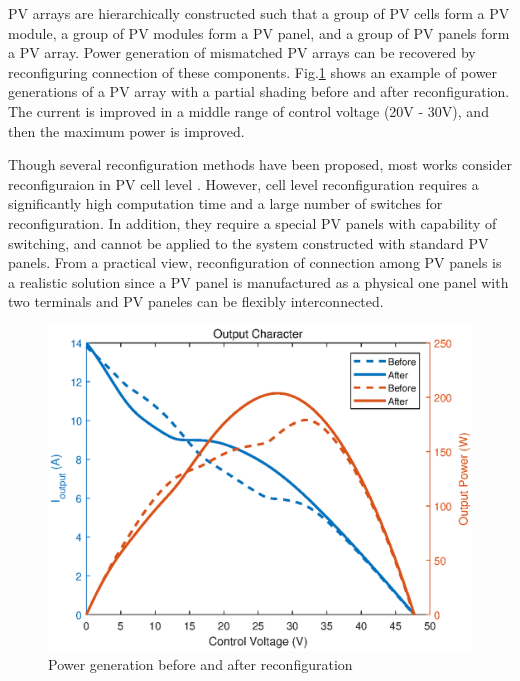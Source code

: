 \documentclass[conference]{IEEEtran}
\begin{document}
PV arrays are hierarchically constructed such that a group of PV cells form a PV module, a group of PV modules form a PV panel, and a group of PV panels form a PV array. Power generation of mismatched PV arrays can be recovered by reconfiguring connection of these components. 
Fig.\ref{compare} shows an example of power generations of a PV array with a partial shading before and after reconfiguration. The current is improved in a middle range of control voltage (20V - 30V), and then the maximum power is improved. 

Though several reconfiguration methods have been proposed, most works consider reconfiguraion in PV cell level \cite{nguyen2008adaptive,wang2014architecture,storey2013improved,storey2014optimized}. 
However, cell level reconfiguration requires a significantly high computation time and a large number of switches for reconfiguration. In addition, they require a special PV panels with capability of switching, and cannot be applied to the system constructed with standard PV panels. From a practical view, reconfiguration of connection among PV panels is a realistic solution since a PV panel is manufactured as a physical one panel with two terminals and PV paneles can be flexibly interconnected. 

\begin{figure}[t]
    \centering
    \includegraphics[width=0.8\linewidth]{compare.eps}
    \caption{Power generation before and after reconfiguration}
    \label{compare}
\end{figure}
\end{document}
